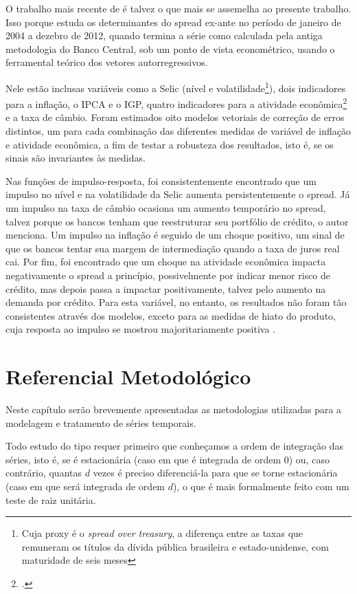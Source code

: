 \documentclass[a4paper,
               article,
               12pt,
               openany,
               oneside,
               english,
               brazil]{abntex2}
\numberwithin{equation}{section}
\begin{document}
    O trabalho mais recente de \textcite{chaim} é talvez o que mais se assemelha ao presente trabalho. Isso porque estuda os determinantes do spread ex-ante no período de janeiro de 2004 a dezebro de 2012, quando termina a série como calculada pela antiga metodologia do Banco Central, sob um ponto de vista econométrico, usando o ferramental teórico dos vetores autorregressivos.

    Nele estão inclusas variáveis como a Selic (nível e volatilidade\footnote{Cuja proxy é o \textit{spread over treasury}, a diferença entre as taxas que remuneram os títulos da dívida pública brasileira e estado-unidense, com maturidade de seis meses}), dois indicadores para a inflação, o IPCA e o IGP, quatro indicadores para a atividade econômica\footcite[20]{chaim} e a taxa de câmbio. Foram estimados oito modelos vetoriais de correção de erros distintos, um para cada combinação das diferentes medidas de variável de inflação e atividade econômica, a fim de testar a robusteza dos resultados, isto é, se os sinais são invariantes às medidas. 

    Nas funções de impulso-resposta, foi consistentemente encontrado que um impulso no nível e na volatilidade da Selic aumenta persistentemente o spread. Já um impulso na taxa de câmbio ocasiona um aumento temporário no spread, talvez porque os bancos tenham que reestruturar seu portfólio de crédito, o autor menciona. Um impulso na inflação é seguido de um choque positivo, um sinal de que os bancos tentar sua margem de intermediação quando a taxa de juros real cai. Por fim, foi encontrado que um choque na atividade econômica impacta negativamente o spread a princípio, possivelmente por indicar menor risco de crédito, mas depois passa a impactar positivamente, talvez pelo aumento na demanda por crédito. Para esta variável, no entanto, os resultados não foram tão consistentes através dos modelos, exceto para as medidas de hiato do produto, cuja resposta ao impulso se mostrou majoritariamente positiva \cite[32-38]{chaim}.

\section{Referencial Metodológico}

    Neste capítulo serão brevemente apresentadas as metodologias utilizadas para a modelagem e tratamento de séries temporais.

    Todo estudo do tipo requer primeiro que conheçamos a ordem de integração das séries, isto é, se é estacionária (caso em que é integrada de ordem 0) ou, caso contrário, quantas $d$ vezes é preciso diferenciá-la para que se torne estacionária (caso em que será integrada de ordem $d$), o que é mais formalmente feito com um teste de raiz unitária.
\end{document}
